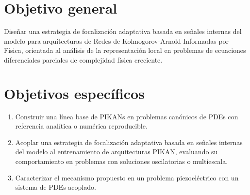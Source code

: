 \label{sec:objetivos}

\section{Objetivo general}

Diseñar una estrategia de focalización adaptativa basada en señales internas del modelo para arquitecturas de Redes de Kolmogorov-Arnold Informadas por Física, orientada al análisis de la representación local en problemas de ecuaciones diferenciales parciales de complejidad física creciente.

\section{Objetivos específicos}

\begin{enumerate}
  \item Construir una línea base de PIKANs en problemas canónicos de PDEs con referencia analítica o numérica reproducible.
  \item Acoplar una estrategia de focalización adaptativa basada en señales internas del modelo al entrenamiento de arquitecturas PIKAN, evaluando su comportamiento en problemas con soluciones oscilatorias o multiescala.
  \item Caracterizar el mecanismo propuesto en un problema piezoeléctrico con un sistema de PDEs acoplado.
\end{enumerate}